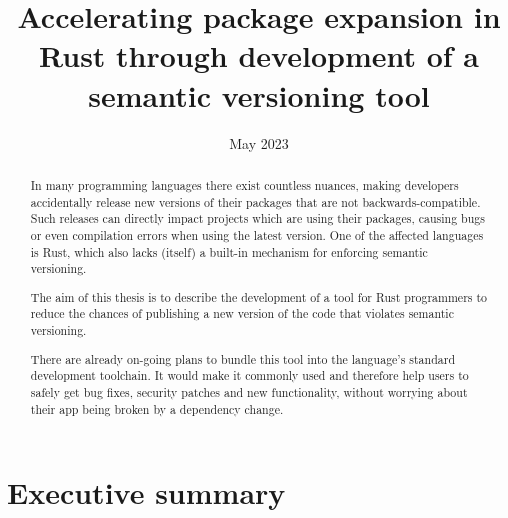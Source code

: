 \documentclass[licencjacka,en]{pracamgr}
\date{May 2023}
\title{Accelerating package expansion in Rust through development of a semantic versioning tool}
\begin{document}
\maketitle

\begin{abstract}
In many programming languages there exist countless nuances, making developers accidentally release
new versions of their packages that are not backwards-compatible. Such releases can directly impact
projects which are using their packages, causing bugs or even compilation errors when using the
latest version. One of the affected languages is Rust, which also lacks (itself) a built-in
mechanism for enforcing semantic versioning.

The aim of this thesis is to describe the development of a tool for Rust programmers to reduce the
chances of publishing a new version of the code that violates semantic versioning.

There are already on-going plans to bundle this tool into the language's standard
development toolchain. It would make it commonly used and therefore help users to safely get
bug fixes, security patches and new functionality, without worrying about their app being broken
by a dependency change.
\end{abstract}




\tableofcontents

\chapter*{Executive summary}
\end{document}
